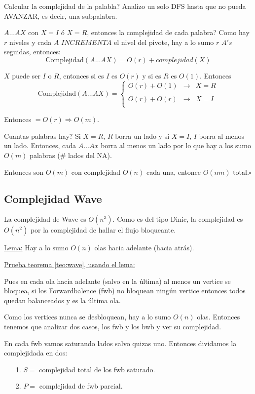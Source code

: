 \documentclass[12pt,a4paper]{article}
\begin{document}
Calcular la complejidad de la palabla? Analizo un solo DFS hasta que no pueda 
AVANZAR, es decir, una subpalabra.
\medskip

$A \ldots AX$ con $X=I$ ó $X=R$, entonces la complejidad de cada palabra? Como hay 
$r$ niveles y cada $A$ $INCREMENTA$ el nivel del pivote, hay a lo sumo $r$ $A's$
seguidas, entonces:
$$\text{Complejidad}(A \ldots AX) = O(r) + complejidad(X)$$

$X$ puede ser $I$ o $R$, entonces si es $I$ es $O(r)$ y si es $R$ es $O(1)$. Entonces 
$$\text{Complejidad}(A \ldots AX)= \left\{ \begin{array}{lcc}
    O(r) + O(1) & \to & X=R \\
    \\O(r) + O(r)& \to & X=I\\
    \end{array}
    \right.$$

Entonces $=O(r) \Rightarrow O(m)$. 
\medskip

Cuantas palabras hay? Si $X=R$, $R$ borra un lado y si $X=I$, $I$ borra al menos 
un lado. Entonces, cada $A \ldots Ax$ borra al menos un lado por lo que hay a los 
sumo $O(m)$ palabras ($\#$ lados del NA).
\medskip

Entonces son $O(m)$ con complejidad $O(n)$ cada una, entonce $O(nm)$ total.$\square$

\subsection{Complejidad Wave}
\begin{teorema} La complejidad de Wave es $O(n^{3})$. Como es del tipo Dinic, la 
    complejidad es $O(n^{2})$ por la complejidad de hallar el flujo bloqueante.
    \label{teo:wave}
\end{teorema}

\underline{Lema:} Hay a lo sumo $O(n)$ olas hacia adelante (hacia atrás).
\medskip

\underline{Prueba teorema \ref{teo:wave}, usando el lema:}
\medskip

Pues en cada ola hacia adelante (salvo en la última) al menos un vertice se bloquea, 
si los Forwardbalence (fwb) no bloquean ningún vertice entonces todos quedan 
balanceados y es la última ola.
\medskip

Como los vertices nunca se desbloquean, hay a lo sumo $O(n)$ olas. Entonces tenemos 
que analizar dos casos, los fwb y los bwb y ver su complejidad. 
\medskip

En cada fwb vamos saturando lados salvo quizas uno. Entonces dividamos la 
complejidada en dos:
\begin{itemize}
    \item [1.] $S=$ complejidad total de los fwb saturado.
    \item [2.] $P=$ complejidad de fwb parcial.
\end{itemize}
\end{document}
